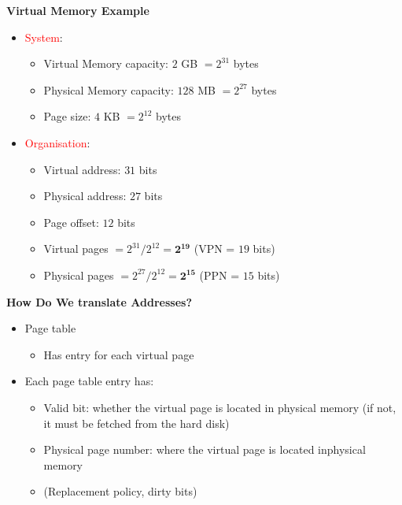 \documentclass[11pt, table, aspectratio=169]{beamer}
\begin{document}
\begin{frame}{\textbf{Virtual Memory Example}}
	\begin{itemize}
		\item \textcolor{red}{System}: 
		\begin{itemize}
			\item Virtual Memory capacity: $2$ GB $= 2^{31}$ bytes 
			\item Physical Memory capacity: $128$ MB $= 2^{27}$ bytes
			\item Page size: $4$ KB $= 2^{12}$ bytes 
		\end{itemize}
		
			\item \textcolor{red}{Organisation}: 
		\begin{itemize}
			\item Virtual address: $31$ bits 
			\item Physical address: $27$ bits 
			\item Page offset: $12$ bits
			\item Virtual pages  $= 2^{31} / 2^{12} = \mathbf{2^{19}}$ (VPN = $19$ bits)
			\item Physical pages  $= 2^{27} / 2^{12} = \mathbf{2^{15}}$ (PPN = $15$ bits)
		\end{itemize}
	\end{itemize}
\end{frame}

\begin{frame}[fragile]{\textbf{How Do We translate Addresses?}}
	\begin{itemize}
		\item Page table
		\begin{itemize}
			\item  Has entry for each virtual page
		\end{itemize}
		\item Each page table entry has: 
		\begin{itemize}
			\item Valid bit: whether the virtual page is located in physical memory (if not, it must be fetched from the hard disk)
			\item Physical page number: where the virtual page is located inphysical memory
			 \item (Replacement policy, dirty bits)
		\end{itemize}
	\end{itemize}
\end{frame}
\end{document}
